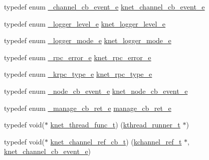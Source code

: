 \begin{DoxyCompactItemize}
\item 
typedef enum \hyperlink{a00066_a2217ac7363dbae279d056a361d122915_a2217ac7363dbae279d056a361d122915}{\+\_\+channel\+\_\+cb\+\_\+event\+\_\+e} \hyperlink{a00066_a2fd2faf971268f5b682ab375c455f7c9_a2fd2faf971268f5b682ab375c455f7c9}{knet\+\_\+channel\+\_\+cb\+\_\+event\+\_\+e}
\item 
typedef enum \hyperlink{a00066_a4e764c733cf98ee587ca17412fca9148_a4e764c733cf98ee587ca17412fca9148}{\+\_\+logger\+\_\+level\+\_\+e} \hyperlink{a00066_a8bb61ec2ff976625d0707a81c1ccc149_a8bb61ec2ff976625d0707a81c1ccc149}{knet\+\_\+logger\+\_\+level\+\_\+e}
\item 
typedef enum \hyperlink{a00066_a95d677e6aef6e1699b92848e4497c23a_a95d677e6aef6e1699b92848e4497c23a}{\+\_\+logger\+\_\+mode\+\_\+e} \hyperlink{a00066_a3ad8e017e53143bca2ada78d2bfa30e1_a3ad8e017e53143bca2ada78d2bfa30e1}{knet\+\_\+logger\+\_\+mode\+\_\+e}
\item 
typedef enum \hyperlink{a00066_a5a9afdfc8281994f0692b49499d731bf_a5a9afdfc8281994f0692b49499d731bf}{\+\_\+rpc\+\_\+error\+\_\+e} \hyperlink{a00066_a09f6be2164ffa374198a4ab2af2e1966_a09f6be2164ffa374198a4ab2af2e1966}{knet\+\_\+rpc\+\_\+error\+\_\+e}
\item 
typedef enum \hyperlink{a00066_aa250e66ac76155c15e3e1d24d0431931_aa250e66ac76155c15e3e1d24d0431931}{\+\_\+krpc\+\_\+type\+\_\+e} \hyperlink{a00066_a6fe1ebc0ddea56dd3c337115c1e10bc4_a6fe1ebc0ddea56dd3c337115c1e10bc4}{knet\+\_\+rpc\+\_\+type\+\_\+e}
\item 
typedef enum \hyperlink{a00066_a2491a05dc920d9e7da623181126fa777_a2491a05dc920d9e7da623181126fa777}{\+\_\+node\+\_\+cb\+\_\+event\+\_\+e} \hyperlink{a00066_a7aebece745b529163834cdbd7ab3ac3f_a7aebece745b529163834cdbd7ab3ac3f}{knet\+\_\+node\+\_\+cb\+\_\+event\+\_\+e}
\item 
typedef enum \hyperlink{a00066_a4675b62a807235136679f9360645725a_a4675b62a807235136679f9360645725a}{\+\_\+manage\+\_\+cb\+\_\+ret\+\_\+e} \hyperlink{a00066_a8c9e6cb76465f1f73326c74c03f5fc8f_a8c9e6cb76465f1f73326c74c03f5fc8f}{manage\+\_\+cb\+\_\+ret\+\_\+e}
\item 
typedef void($\ast$ \hyperlink{a00066_a8741dac4a9f8d97603eb3a30a3473b13_a8741dac4a9f8d97603eb3a30a3473b13}{knet\+\_\+thread\+\_\+func\+\_\+t}) (\hyperlink{a00066_a4f78c259c9527c821f1a6f87495dd339_a4f78c259c9527c821f1a6f87495dd339}{kthread\+\_\+runner\+\_\+t} $\ast$)
\item 
typedef void($\ast$ \hyperlink{a00066_a8a7d96123ef4565c6d08fe58a10476a9_a8a7d96123ef4565c6d08fe58a10476a9}{knet\+\_\+channel\+\_\+ref\+\_\+cb\+\_\+t}) (\hyperlink{a00066_a3b7e82599367eade261456f60ebe2cd9_a3b7e82599367eade261456f60ebe2cd9}{kchannel\+\_\+ref\+\_\+t} $\ast$, \hyperlink{a00066_a2fd2faf971268f5b682ab375c455f7c9_a2fd2faf971268f5b682ab375c455f7c9}{knet\+\_\+channel\+\_\+cb\+\_\+event\+\_\+e})

\end{DoxyCompactItemize}
